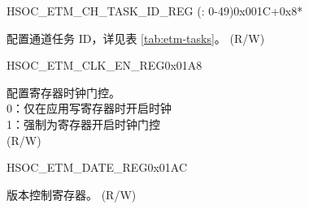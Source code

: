 \begin{register}{H}{SOC\_ETM\_CH\_TASK\_ID\_REG (: 0-49)}{0x001C+0x8*}\label{regdesc:SOCETMCH0TASKIDREG}
%
%
\regnewline%
\begin{regdesc}\begin{reglist}
\label{fielddesc:SOCETMCH0TASKID}\item [SOC\_ETM\_CH\regindex{n}\_TASK\_ID (\regindex{n}: 0-49)] 配置通道任务 ID，详见表 \ref{tab:etm-tasks}。 (R/W)
\end{reglist}\end{regdesc}
\end{register}



\begin{register}{H}{SOC\_ETM\_CLK\_EN\_REG}{0x01A8}\label{regdesc:SOCETMCLKENREG}
%
%
\regnewline%
\begin{regdesc}\begin{reglist}
\label{fielddesc:SOCETMCLKEN}\item [SOC\_ETM\_CLK\_EN] 配置寄存器时钟门控。\\
0：仅在应用写寄存器时开启时钟\\
1：强制为寄存器开启时钟门控\\
(R/W)
\end{reglist}\end{regdesc}
\end{register}


\begin{register}{H}{SOC\_ETM\_DATE\_REG}{0x01AC}\label{regdesc:SOCETMDATEREG}
%
%
\regnewline%
\begin{regdesc}\begin{reglist}
\label{fielddesc:SOCETMDATE}\item [SOC\_ETM\_DATE] 版本控制寄存器。 (R/W)
\end{reglist}\end{regdesc}
\end{register}
